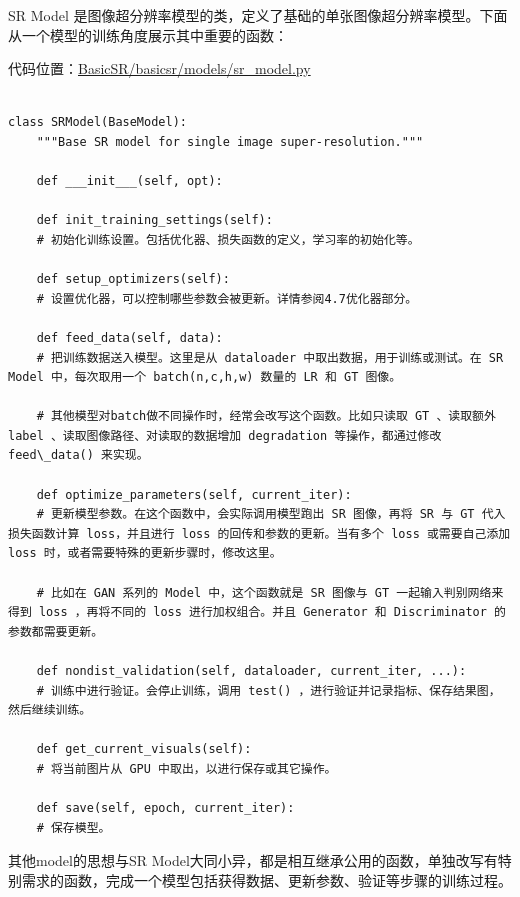 \documentclass[../main.tex]{subfiles}
\begin{document}
SR Model 是图像超分辨率模型的类，定义了基础的单张图像超分辨率模型。下面从一个模型的训练角度展示其中重要的函数：

代码位置：\href{https://github.com/XPixelGroup/BasicSR/blob/master/basicsr/models/sr_model.py}{BasicSR/basicsr/models/sr\_model.py}

\begin{verbatim}

class SRModel(BaseModel):
    """Base SR model for single image super-resolution."""

    def ___init___(self, opt):
        
    def init_training_settings(self):
    # 初始化训练设置。包括优化器、损失函数的定义，学习率的初始化等。
    
    def setup_optimizers(self):
    # 设置优化器，可以控制哪些参数会被更新。详情参阅4.7优化器部分。
       
    def feed_data(self, data):
    # 把训练数据送入模型。这里是从 dataloader 中取出数据，用于训练或测试。在 SR Model 中，每次取用一个 batch(n,c,h,w) 数量的 LR 和 GT 图像。

    # 其他模型对batch做不同操作时，经常会改写这个函数。比如只读取 GT 、读取额外 label 、读取图像路径、对读取的数据增加 degradation 等操作，都通过修改 feed\_data() 来实现。
       
    def optimize_parameters(self, current_iter):
    # 更新模型参数。在这个函数中，会实际调用模型跑出 SR 图像，再将 SR 与 GT 代入损失函数计算 loss，并且进行 loss 的回传和参数的更新。当有多个 loss 或需要自己添加 loss 时，或者需要特殊的更新步骤时，修改这里。
   
    # 比如在 GAN 系列的 Model 中，这个函数就是 SR 图像与 GT 一起输入判别网络来得到 loss ，再将不同的 loss 进行加权组合。并且 Generator 和 Discriminator 的参数都需要更新。

    def nondist_validation(self, dataloader, current_iter, ...):
    # 训练中进行验证。会停止训练，调用 test() ，进行验证并记录指标、保存结果图，然后继续训练。

    def get_current_visuals(self):
    # 将当前图片从 GPU 中取出，以进行保存或其它操作。
        
    def save(self, epoch, current_iter):
    # 保存模型。
\end{verbatim}

其他model的思想与SR Model大同小异，都是相互继承公用的函数，单独改写有特别需求的函数，完成一个模型包括获得数据、更新参数、验证等步骤的训练过程。
\end{document}
